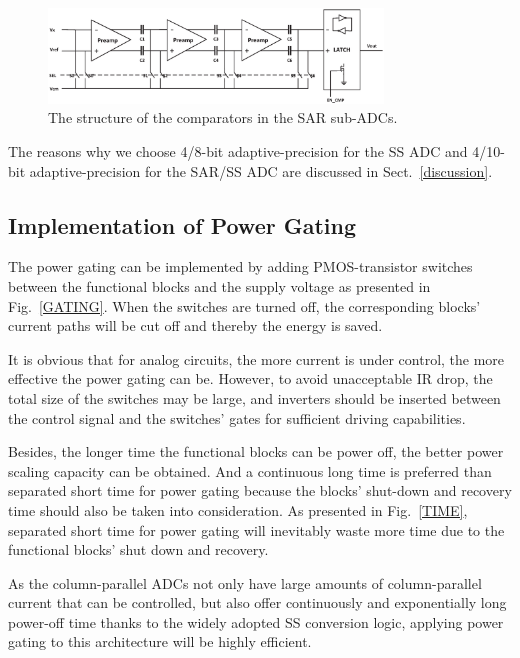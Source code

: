 \begin{figure}[htbp]
	\centerline{\includegraphics[width=3.5in]{./Figures/LATCH.eps}}
	\caption{The structure of the comparators in the SAR sub-ADCs.}
	\label{LATCH}
\end{figure} 

The reasons why we choose 4/8-bit adaptive-precision for the SS ADC and 4/10-bit adaptive-precision for the SAR/SS ADC are discussed in Sect.~\ref{discussion}.


\subsection{Implementation of Power Gating}\label{gating1}

The power gating can be implemented by adding PMOS-transistor switches between the functional blocks and the supply voltage \cite{keating_low_2007} as presented in Fig.~\ref{GATING}. 
When the switches are turned off, the corresponding blocks’ current paths will be cut off and thereby the energy is saved. 

It is obvious that for analog circuits, the more current is under control, the more effective the power gating can be. However, to avoid unacceptable IR drop, the total size of the switches may be large, 
and inverters should be inserted between the control signal and the switches’ gates for sufficient driving capabilities. 

Besides, the longer time the functional blocks can be power off, the better power scaling capacity can be obtained. And a continuous long time is preferred than separated short time for power gating because the blocks' shut-down and recovery time should also be taken into consideration.
As presented in Fig.~\ref{TIME}, separated short time for power gating will inevitably waste more
time due to the functional blocks' shut down and recovery. 

As the column-parallel ADCs not only have large amounts of column-parallel current that can be controlled, but also offer continuously and exponentially long power-off time thanks to the widely adopted SS conversion logic, applying power gating to this architecture will be highly efficient.

